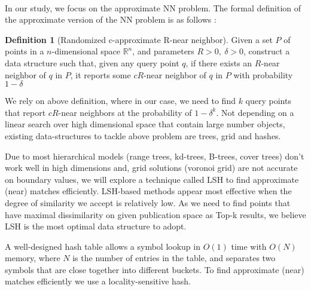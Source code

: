 \documentclass[a4paper,12pt,oneside]{book}
\theoremstyle{definition}
\newtheorem{definition}{Definition}[section]
\theoremstyle{remark}
\begin{document}

\paragraph*{}
In our study, we focus on the approximate \acf{NN} problem. The formal definition of the approximate version of the \ac{NN} problem is as follows \cite{Indyk2008}:
\begin{definition}[Randomized c-approximate R-near neighbor]
Given a set $P$ of points in a $n$-dimensional space $\mathbb{R}^n$, and parameters $R > 0,\ \delta > 0$, construct a data structure such that, given
any query point $q$, if there exists an $R$-near neighbor of $q$ in $P$, it reports some $cR$-near neighbor of $q$ in $P$ with probability $1 - \delta$
\end{definition}

We rely on above definition, where in our case, we need to find $k$ query points that report $cR$-near neighbors at the probability of $1 - \delta^k$. Not depending on a linear search over high dimensional space that contain large number objects, existing data-structures to tackle above problem are trees, grid and hashes.

Due to most hierarchical models (range trees, kd-trees, B-trees, cover trees) don’t work well in high dimensions and, grid solutions (voronoi grid) are not accurate on boundary values, we will explore a technique called \acf{LSH} to find approximate (near) matches efficiently. LSH-based methods appear most effective when the degree of similarity we accept is relatively low. As we need to find points that have maximal dissimilarity on given publication space as Top-k results, we believe LSH is the most optimal data structure to adopt. 

A well-designed hash table allows a symbol lookup in $O(1)$ time with $O(N)$ memory, where $N$ is the number of entries in the table, and separates two symbols that are close together into different buckets. To find approximate (near) matches efficiently we use a locality-sensitive hash.
\end{document}

